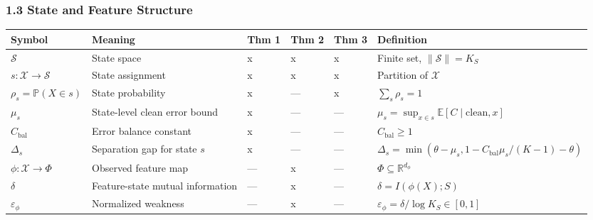 \documentclass[
  12pt,
]{ctexart}
\begin{document}
\subsubsection{1.3 State and Feature
Structure}\label{state-and-feature-structure}

\begin{longtable}[]{@{}
  >{\raggedright\arraybackslash}p{}
  >{\raggedright\arraybackslash}p{}
  >{\raggedright\arraybackslash}p{}
  >{\raggedright\arraybackslash}p{}
  >{\raggedright\arraybackslash}p{}
  >{\raggedright\arraybackslash}p{}@{}}
\toprule\noalign{}
\begin{minipage}[b]{\linewidth}\raggedright
Symbol
\end{minipage} & \begin{minipage}[b]{\linewidth}\raggedright
Meaning
\end{minipage} & \begin{minipage}[b]{\linewidth}\raggedright
Thm 1
\end{minipage} & \begin{minipage}[b]{\linewidth}\raggedright
Thm 2
\end{minipage} & \begin{minipage}[b]{\linewidth}\raggedright
Thm 3
\end{minipage} & \begin{minipage}[b]{\linewidth}\raggedright
Definition
\end{minipage} \\
\midrule\noalign{}
\endhead
\bottomrule\noalign{}
\endlastfoot
\(\mathcal{S}\) & State space & x & x & x & Finite set,
\(\|\mathcal{S}\| = K_S\) \\
\(s : \mathcal{X} \to \mathcal{S}\) & State assignment & x & x & x &
Partition of \(\mathcal{X}\) \\
\(\rho_s = \mathbb{P}(X \in s)\) & State probability & x & --- & x &
\(\sum_s \rho_s = 1\) \\
\(\mu_s\) & State-level clean error bound & x & --- & --- &
\(\mu_s = \sup_{x \in s} \mathbb{E}[C \mid \text{clean}, x]\) \\
\(C_{\text{bal}}\) & Error balance constant & x & --- & --- &
\(C_{\text{bal}} \geq 1\) \\
\(\Delta_s\) & Separation gap for state \(s\) & x & --- & --- &
\(\Delta_s = \min(\theta - \mu_s, 1 - C_{\text{bal}}\mu_s/(K-1) - \theta)\) \\
\(\phi : \mathcal{X} \to \Phi\) & Observed feature map & --- & x & --- &
\(\Phi \subseteq \mathbb{R}^{d_\phi}\) \\
\(\delta\) & Feature-state mutual information & --- & x & --- &
\(\delta = I(\phi(X); S)\) \\
\(\varepsilon_\phi\) & Normalized weakness & --- & x & --- &
\(\varepsilon_\phi = \delta / \log K_S \in [0, 1]\) \\
\end{longtable}
\end{document}
